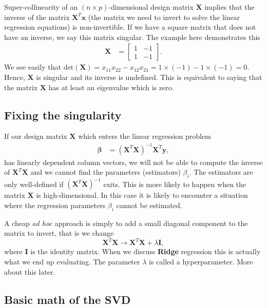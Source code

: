 \documentclass[%
oneside,                 %
final,                   %
10pt]{article}
\begin{document}
Super-collinearity of an $(n \times p)$-dimensional design matrix $\mathbf{X}$ implies
that the inverse of the matrix $\bm{X}^T\bm{x}$ (the matrix we need to invert to solve the linear regression equations) is non-invertible. If we have a square matrix that does not have an inverse, we say this matrix singular. The example here demonstrates this
\begin{align*}
\bm{X} & =  \left[
\begin{array}{rr}
1 & -1
\\
1 & -1
\end{array} \right].
\end{align*}
We see easily that  $\mbox{det}(\bm{X}) = x_{11} x_{22} - x_{12} x_{21} = 1 \times (-1) - 1 \times (-1) = 0$. Hence, $\mathbf{X}$ is singular and its inverse is undefined.
This is equivalent to saying that the matrix $\bm{X}$ has at least an eigenvalue which is zero.


\subsection{Fixing the singularity}

If our design matrix $\bm{X}$ which enters the linear regression problem
\begin{align}
\bm{\beta} & =  (\bm{X}^{T} \bm{X})^{-1} \bm{X}^{T} \bm{y},
\end{align}
has linearly dependent column vectors, we will not be able to compute the inverse
of $\bm{X}^T\bm{X}$ and we cannot find the parameters (estimators) $\beta_i$. 
The estimators are only well-defined if $(\bm{X}^{T}\bm{X})^{-1}$ exits. 
This is more likely to happen when the matrix $\bm{X}$ is high-dimensional. In this case it is likely to encounter a situation where 
the regression parameters $\beta_i$ cannot be estimated.

A cheap  \emph{ad hoc} approach is  simply to add a small diagonal component to the matrix to invert, that is we change
\[
\bm{X}^{T} \bm{X} \rightarrow \bm{X}^{T} \bm{X}+\lambda \bm{I},
\]
where $\bm{I}$ is the identity matrix.  When we discuss \textbf{Ridge} regression this is actually what we end up evaluating. The parameter $\lambda$ is called a hyperparameter. More about this later. 



\subsection{Basic math of the SVD}
\end{document}
